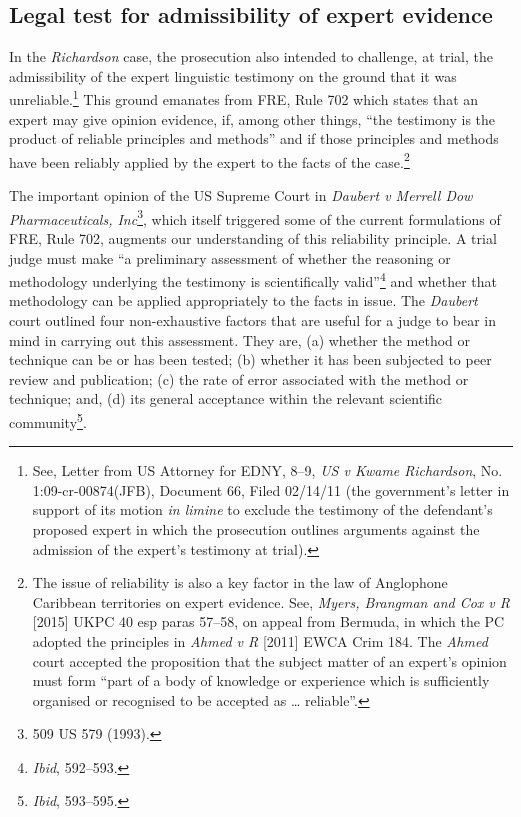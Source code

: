 \documentclass[output=paper,colorlinks,citecolor=brown]{langscibook}
\begin{document}
\subsection{Legal test for admissibility of expert evidence}

In the \emph{Richardson} case, the prosecution also intended to challenge, at trial, the admissibility of the expert linguistic testimony on the ground that it was unreliable.\footnote{See, Letter from US Attorney for EDNY, 8--9, \emph{US v Kwame Richardson}, No. 1:09-cr-00874(JFB), Document 66, Filed 02/14/11 (the government’s letter in support of its motion \emph{in limine} to exclude the testimony of the defendant’s proposed expert in which the prosecution outlines arguments against the admission of the expert’s testimony at trial).} This ground emanates from FRE, Rule 702 which states that an expert may give opinion evidence, if, among other things, “the testimony is the product of reliable principles and methods” and if those principles and methods have been reliably applied by the expert to the facts of the case.\footnote{The issue of reliability is also a key factor in the law of Anglophone Caribbean territories on expert evidence. See, \emph{Myers, Brangman and Cox v R} [2015] UKPC 40 esp paras 57--58, on appeal from Bermuda, in which the PC adopted the principles in \emph{Ahmed v R} [2011] EWCA Crim 184. The \emph{Ahmed} court accepted the proposition that the subject matter of an expert’s opinion must form “part of a body of knowledge or experience which is sufficiently organised or recognised to be accepted as … reliable”.}   

The important opinion of the US Supreme Court in \emph{Daubert v Merrell Dow Pharmaceuticals, Inc}\footnote{509 US 579 (1993).}, which itself triggered some of the current formulations of FRE, Rule 702, augments our understanding of this reliability principle. A trial judge must make “a preliminary assessment of whether the reasoning or methodology underlying the testimony is scientifically valid”\footnote{\emph{Ibid}, 592--593.} and whether that methodology can be applied appropriately to the facts in issue. The \emph{Daubert} court outlined four non-exhaustive factors that are useful for a judge to bear in mind in carrying out this assessment. They are, (a) whether the method or technique can be or has been tested; (b) whether it has been subjected to peer review and publication; (c) the rate of error associated with the method or technique; and, (d) its general acceptance within the relevant scientific community\footnote{\emph{Ibid}, 593--595.}.
\end{document}
